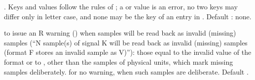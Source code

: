 \begin{params}
  . Keys and values follow the rules of ; a
   or  value is an error, no two keys may differ only in letter case,
  and none may be the key of an entry in . Default : none.
\item[invalid\_warning]  to issue an R warning () when samples
  will be read back as invalid (missing) samples (``N sample(s) of signal K will be read
  back as invalid (missing) samples (format F stores an invalid sample as V)''): those
  equal to the invalid value of the format or to , other than
  the  samples of physical units, which mark missing samples deliberately.
   for no warning, when such samples are deliberate. Default .
\end{params}
